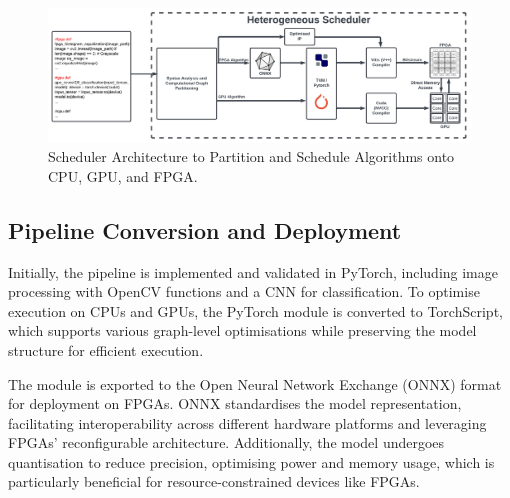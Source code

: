 \documentclass[]{spie}  %
\begin{document}
\begin{figure}[tb]
\centering
\includegraphics[width=\textwidth]{images/SPIE_Deployment_Flow.png} 
\caption{Scheduler Architecture to Partition and Schedule Algorithms onto CPU, GPU, and FPGA.}
\label{fig:deployment_flow}
\end{figure}

\subsection{Pipeline Conversion and Deployment}

Initially, the pipeline is implemented and validated in PyTorch, including image processing with OpenCV functions and a CNN for classification. To optimise execution on CPUs and GPUs, the PyTorch module is converted to TorchScript, which supports various graph-level optimisations while preserving the model structure for efficient execution.

The module is exported to the Open Neural Network Exchange (ONNX) format for deployment on FPGAs. ONNX standardises the model representation, facilitating interoperability across different hardware platforms and leveraging FPGAs' reconfigurable architecture. Additionally, the model undergoes quantisation to reduce precision, optimising power and memory usage, which is particularly beneficial for resource-constrained devices like FPGAs.
\end{document}
